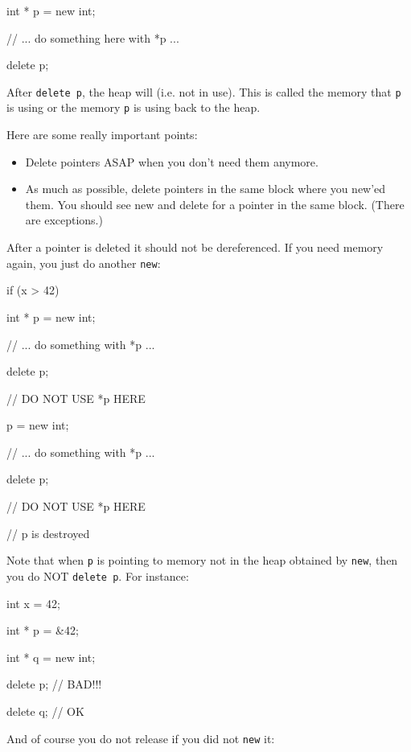 \begin{consolethree}[escapeinside=||]
int * p = new int;

// ... do something here with *p ...

delete p;
\end{consolethree}
After \texttt{delete p}, the heap will  (i.e. not in use). This is called  the memory that \texttt{p} is using or  the memory \texttt{p} is using back to the heap.

Here are some really important points:

\begin{itemize}

\item
  Delete pointers ASAP when you don't need them anymore.
\item
  As much as possible, delete pointers in the same block where you
  new'ed them. You should see new and delete for a pointer in the same
  block. (There are exceptions.)
\end{itemize}

After a pointer is deleted it should not be dereferenced. If you need memory again, you just do another \texttt{new}:

\begin{consolethree}[escapeinside=||]
if (x > 42)
{
    int * p = new int;

    // ... do something with *p ...

    delete p;

    // DO NOT USE *p HERE

    p = new int;

    // ... do something with *p ...

    delete p;

    // DO NOT USE *p HERE
}

// p is destroyed 
\end{consolethree}
Note that when \texttt{p} is pointing to memory not in the heap obtained by \texttt{new}, then you do NOT \texttt{delete p}. For instance:

\begin{consolethree}[escapeinside=||]
int x = 42;

int * p = &42;

int * q = new int;

delete p; // BAD!!!

delete q; // OK
\end{consolethree}
And of course you do not release if you did not \texttt{new} it:

